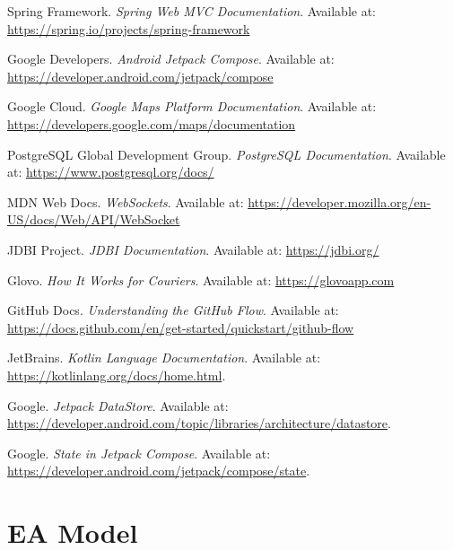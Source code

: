 \documentclass[a4paper,twoside,11pt]{article}
\begin{document}

\begin{thebibliography}{9}

Spring Framework. \textit{Spring Web MVC Documentation}. Available at: \url{https://spring.io/projects/spring-framework}

Google Developers. \textit{Android Jetpack Compose}. Available at: \url{https://developer.android.com/jetpack/compose}

Google Cloud. \textit{Google Maps Platform Documentation}. Available at: \url{https://developers.google.com/maps/documentation}

PostgreSQL Global Development Group. \textit{PostgreSQL Documentation}. Available at: \url{https://www.postgresql.org/docs/}

MDN Web Docs. \textit{WebSockets}. Available at: \url{https://developer.mozilla.org/en-US/docs/Web/API/WebSocket}

JDBI Project. \textit{JDBI Documentation}. Available at: \url{https://jdbi.org/}

Glovo. \textit{How It Works for Couriers}. Available at: \url{https://glovoapp.com}

GitHub Docs. \textit{Understanding the GitHub Flow}. Available at: \url{https://docs.github.com/en/get-started/quickstart/github-flow}

JetBrains. \textit{Kotlin Language Documentation}. Available at: \url{https://kotlinlang.org/docs/home.html}. 

Google. \textit{Jetpack DataStore}. Available at: \url{https://developer.android.com/topic/libraries/architecture/datastore}.

Google. \textit{State in Jetpack Compose}. Available at: \url{https://developer.android.com/jetpack/compose/state}.

\end{thebibliography}

\newpage
\thispagestyle{empty}
\null
\newpage

\appendix

\section{EA Model}
\end{document}
